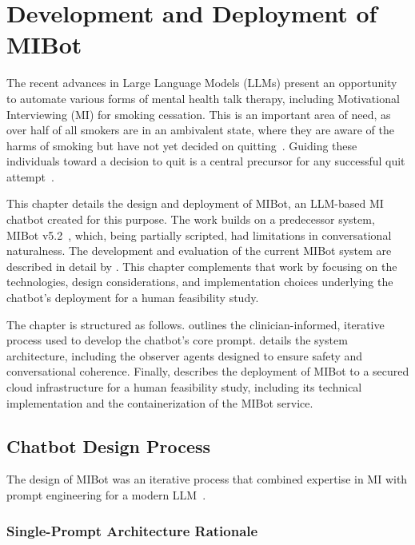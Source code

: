 \chapter{Development and Deployment of MIBot}
\label{ch:mibot}

The recent advances in Large Language Models (LLMs) present an opportunity to automate various forms of mental health talk therapy, including Motivational Interviewing (MI) for smoking cessation. This is an important area of need, as over half of all smokers are in an ambivalent state, where they are aware of the harms of smoking but have not yet decided on quitting~\citep{Babb2017}. Guiding these individuals toward a decision to quit is a central precursor for any successful quit attempt~\citep{West2006}.

This chapter details the design and deployment of MIBot, an LLM-based MI chatbot created for this purpose. The work builds on a predecessor system, MIBot v5.2~\citep{brown2023mi}, which, being partially scripted, had limitations in conversational naturalness. The development and evaluation of the current MIBot system are described in detail by \citet{mahmood-etal-2025-fully}. This chapter complements that work by focusing on the technologies, design considerations, and implementation choices underlying the chatbot's deployment for a human feasibility study.

The chapter is structured as follows.  outlines the clinician-informed, iterative process used to develop the chatbot's core prompt.  details the system architecture, including the observer agents designed to ensure safety and conversational coherence. Finally,  describes the deployment of MIBot to a secured cloud infrastructure for a human feasibility study, including its technical implementation and the containerization of the MIBot service.




\section{Chatbot Design Process}
\label{sec:iterative-development}

The design of MIBot was an iterative process that combined expertise in MI with prompt engineering for a modern LLM~\citep{openai2024gpt4ocard}.

\subsection{Single-Prompt Architecture Rationale}
\label{sec:single-prompt-rationale}

